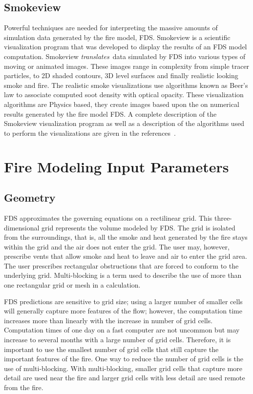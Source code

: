 \documentclass[11pt]{book}
\begin{document}
\subsection{Smokeview}
Powerful techniques are needed for interpreting the massive amounts of simulation data generated by the fire model, FDS.  Smokeview is a scientific visualization program that was developed to display the results of an FDS model computation. Smokeview {\em translates}\ data simulated by FDS into various types of moving or animated images.  These images range in complexity from simple tracer particles, to 2D shaded contours, 3D level surfaces and finally realistic looking smoke and fire.  The realistic smoke visualizations use algorithms known as Beer's law to associate computed soot density with optical opacity.  These visualization algorithms are Physics based, they create images based upon the on numerical results generated by the fire model FDS.  A complete description of the Smokeview visualization program as well as a description of the algorithms used to perform the visualizations are given in the references~\cite{Smokeview_Users_Guide_5,Smokeview_Tech_Guide_5}.

\section{Fire Modeling Input Parameters}

\subsection{Geometry}
FDS approximates the governing equations on a rectilinear grid. This three-dimensional grid represents the volume modeled by FDS. The grid is isolated from the surroundings, that is, all the smoke and heat generated by the fire stays within the grid and the air does not enter the grid. The user may, however, prescribe vents that allow smoke and heat to leave and air to enter the grid area. The user prescribes rectangular obstructions that are forced to conform to the underlying grid. Multi-blocking is a term used to describe the use of more than one rectangular grid or mesh in a calculation.

FDS predictions are sensitive to grid size; using a larger number of smaller cells will generally capture more features of the flow; however, the computation time increases more than linearly with the increase in number of grid cells. Computation times of one day on a fast computer are not uncommon but may increase to several months with a large number of grid cells. Therefore, it is important to use the smallest number of grid cells that still capture the important features of the fire. One way to reduce the number of grid cells is the use of multi-blocking. With multi-blocking, smaller grid cells that capture more detail are used near the fire and larger grid cells with less detail are used remote from the fire.
\end{document}
